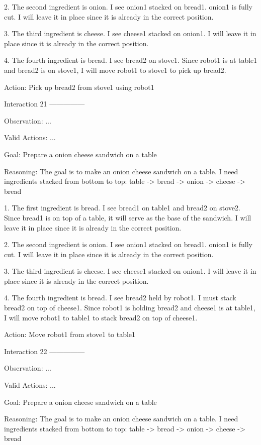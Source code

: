 2. The second ingredient is onion. I see onion1 stacked on bread1. onion1 is fully cut. I will leave it in place since it is already in the correct position.

3. The third ingredient is cheese. I see cheese1 stacked on onion1. I will leave it in place since it is already in the correct position.

4. The fourth ingredient is bread. I see bread2 on stove1. Since robot1 is at table1 and bread2 is on stove1, I will move robot1 to stove1 to pick up bread2.

Action: Pick up bread2 from stove1 using robot1


Interaction 21
---------------


Observation:
...

Valid Actions:
...

Goal: Prepare a onion cheese sandwich on a table


Reasoning: The goal is to make an onion cheese sandwich on a table. I need ingredients stacked from bottom to top: table -> bread -> onion -> cheese -> bread

1. The first ingredient is bread. I see bread1 on table1 and bread2 on stove2. Since bread1 is on top of a table, it will serve as the base of the sandwich. I will leave it in place since it is already in the correct position.

2. The second ingredient is onion. I see onion1 stacked on bread1. onion1 is fully cut. I will leave it in place since it is already in the correct position.

3. The third ingredient is cheese. I see cheese1 stacked on onion1. I will leave it in place since it is already in the correct position.

4. The fourth ingredient is bread. I see bread2 held by robot1. I must stack bread2 on top of cheese1. Since robot1 is holding bread2 and cheese1 is at table1, I will move robot1 to table1 to stack bread2 on top of cheese1.

Action: Move robot1 from stove1 to table1


Interaction 22
---------------


Observation:
...

Valid Actions:
...

Goal: Prepare a onion cheese sandwich on a table


Reasoning: The goal is to make an onion cheese sandwich on a table. I need ingredients stacked from bottom to top: table -> bread -> onion -> cheese -> bread


